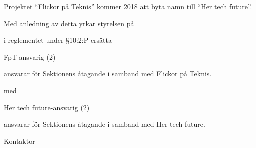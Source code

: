 \documentclass[../_main/handlingar.tex]{subfiles}
\begin{document}
Projektet ``Flickor på Teknis'' kommer 2018 att byta namn till ``Her tech future''.

Med anledning av detta yrkar styrelsen på
\begin{attsatser}
    \att i reglementet under \S10:2:P ersätta\par
        FpT-ansvarig (2)
        \begin{tightdashlist}
            \item ansvarar för Sektionens åtagande i samband med Flickor på Teknis.
        \end{tightdashlist}
        med

          Her tech future-ansvarig (2)
          \begin{tightdashlist}
              \item ansvarar för Sektionens åtagande i samband med Her tech future.
          \end{tightdashlist}
\end{attsatser}

\begin{signatures}{1}
    \ist
    \signature{\sekr}{Kontaktor}
\end{signatures}
\end{document}
